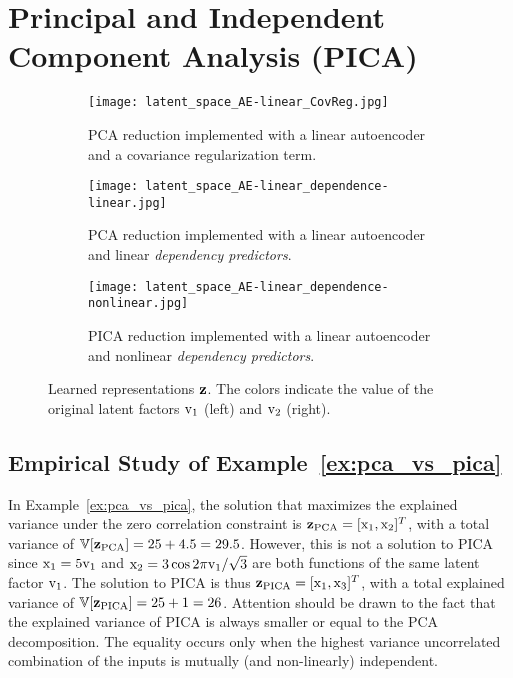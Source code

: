 \section{Principal and Independent Component Analysis (PICA)}

\begin{figure}
    \begin{subfigure}{\textwidth}
        \centering
        \texttt{[image: latent\_space\_AE-linear\_CovReg.jpg]}
        \caption{PCA reduction implemented with a linear autoencoder and a covariance regularization term.}
        \label{fig:latent_space_pca_covreg}
    \end{subfigure}
    \vspace{20px}
    \begin{subfigure}{\textwidth}
        \centering
        \texttt{[image: latent\_space\_AE-linear\_dependence-linear.jpg]}
        \caption{PCA reduction implemented with a linear autoencoder and linear \textit{dependency predictors}.}
        \label{fig:latent_space_pca_lin_dependency}
    \end{subfigure}
    \vspace{20px}
    \begin{subfigure}{\textwidth}
        \centering
        \texttt{[image: latent\_space\_AE-linear\_dependence-nonlinear.jpg]}
        \caption{PICA reduction implemented with a linear autoencoder and nonlinear \textit{dependency predictors}.}
        \label{fig:latent_space_pica_nonlin_dependency}
    \end{subfigure}%
    \caption{Learned representations ${\mathbf{z}}$. The colors indicate the value of the original latent factors ${\textnormal{v}}_1$ (left) and ${\textnormal{v}}_2$ (right). }
    \label{fig:latent_spaces_pca_pica_example}
\end{figure}


\subsection{Empirical Study of Example~\ref{ex:pca_vs_pica}} \label{subapp:pca_ipca_example_eval}

In Example~\ref{ex:pca_vs_pica}, the solution that maximizes the explained variance under the zero correlation constraint is ${\mathbf{z}}_{\mathrm{PCA}} = [{\textnormal{x}}_1,{\textnormal{x}}_2]^T$, with a total variance of $\mathbb{V}[{\mathbf{z}}_{\mathrm{PCA}}] = 25 + 4.5 = 29.5$. 
However, this is not a solution to PICA since ${\textnormal{x}}_1 = 5 {\textnormal{v}}_1$ and ${\textnormal{x}}_2 = 3 \cos{2\pi{\textnormal{v}}_1/\sqrt{3}}$ are both functions of the same latent factor ${\textnormal{v}}_1$. 
The solution to PICA is thus ${\mathbf{z}}_{\mathrm{PICA}} = [{\textnormal{x}}_1,{\textnormal{x}}_3]^T$, with a total explained variance of $\mathbb{V}[{\mathbf{z}}_{\mathrm{PICA}}] = 25 + 1 = 26$. 
Attention should be drawn to the fact that the explained variance of PICA is always smaller or equal to the PCA decomposition. The equality occurs only when the highest variance uncorrelated combination of the inputs is mutually (and non-linearly) independent. 

